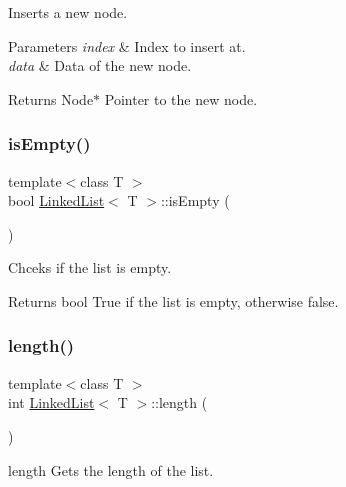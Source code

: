 Inserts a new node. 


\begin{DoxyParams}{Parameters}
{\em index} & Index to insert at. \\
\hline
{\em data} & Data of the new node. \\
\hline
\end{DoxyParams}
\begin{DoxyReturn}{Returns}
Node$\ast$ Pointer to the new node. 
\end{DoxyReturn}
\mbox{\label{classLinkedList_a7ecbb28e82117a680839ed0dc28ebdce}} 
\subsubsection{\texorpdfstring{is\+Empty()}{isEmpty()}}
{\footnotesize\ttfamily template$<$class T $>$ \\
bool \hyperlink{classLinkedList}{Linked\+List}$<$ T $>$\+::is\+Empty (\begin{DoxyParamCaption}{ }\end{DoxyParamCaption})\hspace{0.3cm}{\ttfamily [inline]}}



Chceks if the list is empty. 

\begin{DoxyReturn}{Returns}
bool True if the list is empty, otherwise false. 
\end{DoxyReturn}
\mbox{\label{classLinkedList_a33ccc185173763fde944238f0f269bf0}} 
\subsubsection{\texorpdfstring{length()}{length()}}
{\footnotesize\ttfamily template$<$class T $>$ \\
int \hyperlink{classLinkedList}{Linked\+List}$<$ T $>$\+::length (\begin{DoxyParamCaption}{ }\end{DoxyParamCaption})\hspace{0.3cm}{\ttfamily [inline]}}



length Gets the length of the list. 

